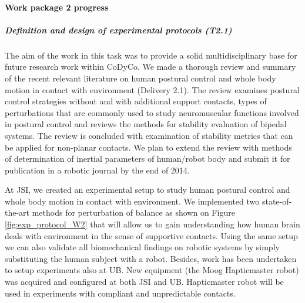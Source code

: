 \documentclass[12pt,a4paper,twoside]{article}
\begin{document}
\paragraph{Work package 2 progress}

\subparagraph{Definition and design of experimental protocols (T2.1)}

The aim of the work in this task was to provide a solid multidisciplinary base for future research work within CoDyCo. We made a thorough review and summary of the recent relevant literature on human postural control and whole body motion in contact with environment (Delivery 2.1). The review examines postural control strategies without and with additional support contacts, types of perturbations that are commonly used to study neuromuscular functions involved in postural control and reviews the methods for stability evaluation of bipedal systems. The review is concluded with examination of stability metrics that can be applied for non-planar contacts. We plan to extend the review with methods of determination of inertial parameters of human/robot body and submit it for publication in a robotic journal by the end of 2014.

At JSI, we created an experimental setup to study human postural control and whole body motion in contact with environment. We implemented two state-of-the-art methods for perturbation of balance as shown on Figure \ref{fig:exp_protocol_W2} that will allow us to gain understanding how human brain deals with environment in the sense of supportive contacts. Using the same setup we can also validate all biomechanical findings on robotic systems by simply substituting the human subject with a robot. Besides, work has been undertaken to setup experiments also at UB. New equipment (the Moog Hapticmaster robot) was acquired and configured at both JSI and UB. Hapticmaster robot will be used in experiments with compliant and unpredictable contacts.
\end{document}
